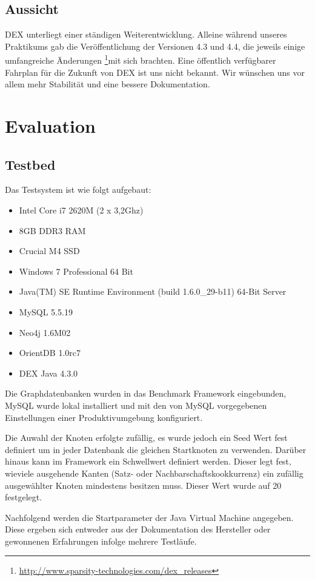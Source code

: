 \documentclass[11pt, a4paper, oneside]{article} %
\begin{document}
\subsection{Aussicht}
DEX unterliegt einer ständigen Weiterentwicklung. Alleine während unseres Praktikums gab die Veröffentlichung der Versionen 4.3 und 4.4, die jeweils einige umfangreiche Änderungen \footnote{\url{http://www.sparsity-technologies.com/dex_releases}}mit sich brachten. Eine öffentlich verfügbarer Fahrplan für die Zukunft von DEX ist uns nicht bekannt. Wir wünschen uns vor allem mehr Stabilität und eine bessere Dokumentation.

\section{Evaluation}

\subsection{Testbed}

Das Testsystem ist wie folgt aufgebaut: 
\begin{itemize}
	\item Intel Core i7 2620M (2 x 3,2Ghz)
	\item 8GB DDR3 RAM
	\item Crucial M4 SSD
	\item Windows 7 Professional 64 Bit
	\item Java(TM) SE Runtime Environment (build 1.6.0\_{}29-b11) 64-Bit Server
	\item MySQL 5.5.19
	\item Neo4j 1.6M02
	\item OrientDB 1.0rc7
	\item DEX Java 4.3.0
\end{itemize}
Die Graphdatenbanken wurden in das Benchmark Framework eingebunden, MySQL wurde lokal installiert und mit den von MySQL vorgegebenen Einstellungen einer Produktivumgebung konfiguriert.
\par
Die Auwahl der Knoten erfolgte zufällig, es wurde jedoch ein Seed Wert fest definiert um in jeder Datenbank die gleichen Startknoten zu verwenden. Darüber hinaus kann im Framework ein Schwellwert definiert werden. Dieser legt fest, wieviele ausgehende Kanten (Satz- oder Nachbarschaftskookkurrenz) ein zufällig ausgewählter Knoten mindestens besitzen muss. Dieser Wert wurde auf 20 festgelegt.
\par
Nachfolgend werden die Startparameter der Java Virtual Machine angegeben. Diese ergeben sich entweder aus der Dokumentation des Hersteller oder gewonnenen Erfahrungen infolge mehrere Testläufe.
\end{document}
